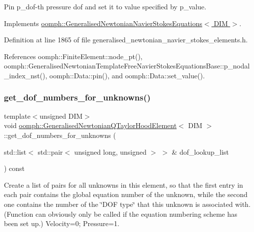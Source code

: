 Pin p\+\_\+dof-\/th pressure dof and set it to value specified by p\+\_\+value. 



Implements \hyperlink{classoomph_1_1GeneralisedNewtonianNavierStokesEquations_a1a39938f37a0a61229e273ea541d5437}{oomph\+::\+Generalised\+Newtonian\+Navier\+Stokes\+Equations$<$ D\+I\+M $>$}.



Definition at line 1865 of file generalised\+\_\+newtonian\+\_\+navier\+\_\+stokes\+\_\+elements.\+h.



References oomph\+::\+Finite\+Element\+::node\+\_\+pt(), oomph\+::\+Generalised\+Newtonian\+Template\+Free\+Navier\+Stokes\+Equations\+Base\+::p\+\_\+nodal\+\_\+index\+\_\+nst(), oomph\+::\+Data\+::pin(), and oomph\+::\+Data\+::set\+\_\+value().

\mbox{\label{classoomph_1_1GeneralisedNewtonianQTaylorHoodElement_ab88a4e14c48864239def0f2ae164528e}} 
\subsubsection{\texorpdfstring{get\+\_\+dof\+\_\+numbers\+\_\+for\+\_\+unknowns()}{get\_dof\_numbers\_for\_unknowns()}}
{\footnotesize\ttfamily template$<$unsigned D\+IM$>$ \\
void \hyperlink{classoomph_1_1GeneralisedNewtonianQTaylorHoodElement}{oomph\+::\+Generalised\+Newtonian\+Q\+Taylor\+Hood\+Element}$<$ D\+IM $>$\+::get\+\_\+dof\+\_\+numbers\+\_\+for\+\_\+unknowns (\begin{DoxyParamCaption}\item[{std\+::list$<$ std\+::pair$<$ unsigned long, unsigned $>$ $>$ \&}]{dof\+\_\+lookup\+\_\+list }\end{DoxyParamCaption}) const\hspace{0.3cm}{\ttfamily [virtual]}}



Create a list of pairs for all unknowns in this element, so that the first entry in each pair contains the global equation number of the unknown, while the second one contains the number of the \char`\"{}\+D\+O\+F type\char`\"{} that this unknown is associated with. (Function can obviously only be called if the equation numbering scheme has been set up.) Velocity=0; Pressure=1. 

